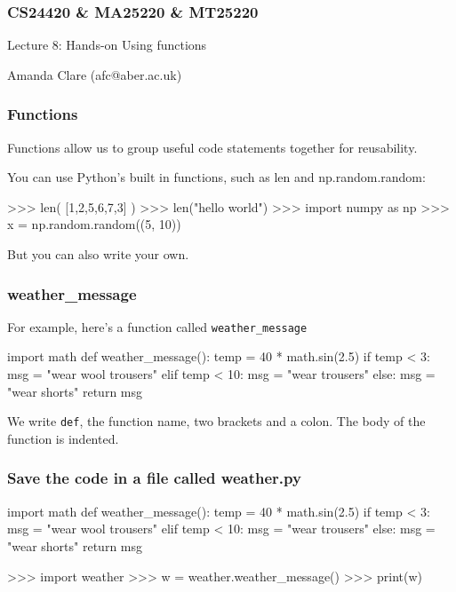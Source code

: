 \documentclass{beamer}
\begin{document}

\begin{frame}
\frametitle{CS24420 \& MA25220 \& MT25220}

\begin{center}
\begin{huge}
Lecture 8: Hands-on Using functions 
\end{huge}
\bigskip

Amanda Clare (afc@aber.ac.uk)

\end{center}
\end{frame}


\begin{frame}[fragile]
\frametitle{Functions}
Functions allow us to group useful code statements
together for reusability.

\bigskip

You can use Python's built in functions, such
as len and np.random.random:
\begin{code}
>>> len( [1,2,5,6,7,3] )
>>> len("hello world")
>>> import numpy as np
>>> x = np.random.random((5, 10))
\end{code}
But you can also write your own.
\end{frame}


\begin{frame}[fragile]
\frametitle{weather\_message}
For example, here's a function called \texttt{weather\_message}
\begin{code}
import math
def weather_message():
   temp = 40 * math.sin(2.5)
   if temp < 3:
      msg = "wear wool trousers"
   elif temp < 10:
      msg = "wear trousers"
   else: 
      msg = "wear shorts"
   return msg
\end{code}
\pause
We write \texttt{def}, the function name, two brackets and a
colon.
The body of the function is indented.
\end{frame}

\begin{frame}[fragile]
\frametitle{Save the code in a file called weather.py}
\begin{shaded}
\begin{code}
import math
def weather_message():
   temp = 40 * math.sin(2.5)
   if temp < 3:
      msg = "wear wool trousers"
   elif temp < 10:
      msg = "wear trousers"
   else: 
      msg = "wear shorts"
   return msg
\end{code}
\end{shaded}
\begin{code}
>>> import weather
>>> w = weather.weather_message()
>>> print(w)
\end{code}
\end{frame}
\end{document}

